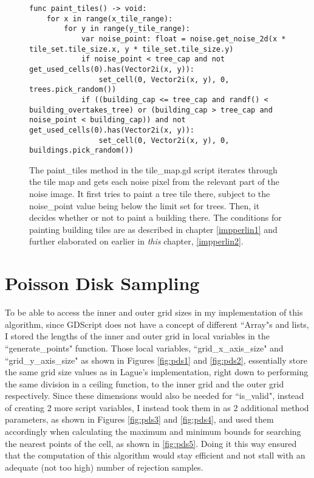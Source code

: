 \begin{figure}[H]
    \centering
    \begin{lstlisting}
func paint_tiles() -> void:
	for x in range(x_tile_range):
		for y in range(y_tile_range):
			var noise_point: float = noise.get_noise_2d(x * tile_set.tile_size.x, y * tile_set.tile_size.y)
			if noise_point < tree_cap and not get_used_cells(0).has(Vector2i(x, y)):
				set_cell(0, Vector2i(x, y), 0, trees.pick_random())
			if ((building_cap <= tree_cap and randf() < building_overtakes_tree) or (building_cap > tree_cap and noise_point < building_cap)) and not get_used_cells(0).has(Vector2i(x, y)):
				set_cell(0, Vector2i(x, y), 0, buildings.pick_random())
    \end{lstlisting}
    \caption{The paint\_tiles method in the tile\_map.gd script iterates through the tile map and gets each noise pixel from the relevant part of the noise image. It first tries to paint a tree tile there, subject to the noise\_point value being below the limit set for trees. Then, it decides whether or not to paint a building there. The conditions for painting building tiles are as described in chapter \ref{impperlin1} and further elaborated on earlier in \textit{this} chapter, \ref{impperlin2}.}
    \label{fig:simplex3}
\end{figure}

\section{Poisson Disk Sampling}

To be able to access the inner and outer grid sizes in my implementation of this algorithm, since GDScript does not have a concept of different ``Array"s and lists, I stored the lengths of the inner and outer grid in local variables in the ``generate\_points" function. Those local variables, ``grid\_x\_axis\_size" and ``grid\_y\_axis\_size" as shown in Figures \ref{fig:pds1} and \ref{fig:pds2}, essentially store the same grid size values as in Lague's implementation, right down to performing the same division in a ceiling function, to the inner grid and the outer grid respectively. Since these dimensions would also be needed for ``is\_valid", instead of creating 2 more script variables, I instead took them in as 2 additional method parameters, as shown in Figures \ref{fig:pds3} and \ref{fig:pds4}, and used them accordingly when calculating the maximum and minimum bounds for searching the nearest points of the cell, as shown in \ref{fig:pds5}. Doing it this way ensured that the computation of this algorithm would stay efficient and not stall with an adequate (not too high) number of rejection samples.

